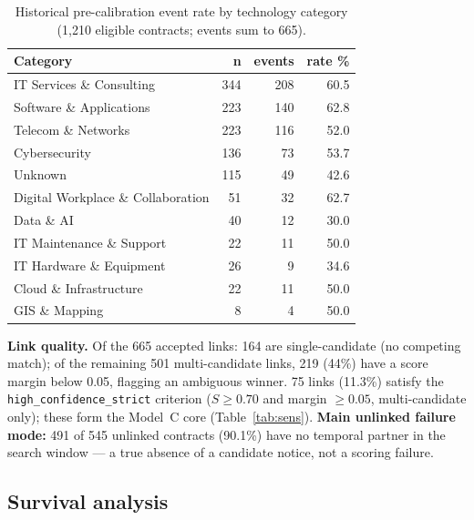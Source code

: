 \documentclass[11pt,a4paper]{article}
\begin{document}
\begin{table}[H]
\centering
\caption{Historical pre-calibration event rate by technology category
(1{,}210 eligible contracts; events sum to 665).}
\label{tab:bycat}
\small
\begin{tabular}{@{}lrrr@{}}
\toprule
\textbf{Category} & \textbf{n} & \textbf{events} & \textbf{rate \%} \\
\midrule
IT Services \& Consulting          & 344 & 208 & 60.5 \\
Software \& Applications           & 223 & 140 & 62.8 \\
Telecom \& Networks                & 223 & 116 & 52.0 \\
Cybersecurity                      & 136 &  73 & 53.7 \\
Unknown                            & 115 &  49 & 42.6 \\
Digital Workplace \& Collaboration &  51 &  32 & 62.7 \\
Data \& AI                         &  40 &  12 & 30.0 \\
IT Maintenance \& Support          &  22 &  11 & 50.0 \\
IT Hardware \& Equipment           &  26 &   9 & 34.6 \\
Cloud \& Infrastructure            &  22 &  11 & 50.0 \\
GIS \& Mapping                     &   8 &   4 & 50.0 \\
\bottomrule
\end{tabular}
\end{table}

\textbf{Link quality.} Of the 665 accepted links: 164 are single-candidate
(no competing match); of the remaining 501 multi-candidate links, 219 (44\%)
have a score margin below 0.05, flagging an ambiguous winner. 75 links (11.3\%)
satisfy the \texttt{high\_confidence\_strict} criterion ($S \geq 0.70$ and margin
$\geq 0.05$, multi-candidate only); these form the Model~C core
(Table~\ref{tab:sens}). \textbf{Main unlinked failure mode:} 491 of 545 unlinked
contracts (90.1\%) have no temporal partner in the search window --- a true absence
of a candidate notice, not a scoring failure.

\subsection{Survival analysis}
\end{document}

